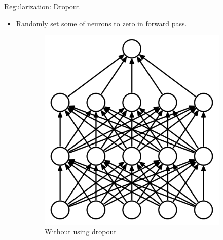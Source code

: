 \begin{frame}{Regularization: Dropout}
\begin{itemize}
	\item Randomly set some of neurons to zero in forward pass.
\end{itemize}
\begin{figure}[H]
\centering
\begin{subfigure}[b]{0.3\textwidth}
	\centering
	\includegraphics[width=\textwidth]{Figs/Dropout-before.png}
	\caption{Without using dropout}
	\label{fig:Dropout-before}
\end{subfigure}
\begin{subfigure}[b]{0.3\textwidth}
	\centering

\end{subfigure}
\end{figure}
\end{frame}
